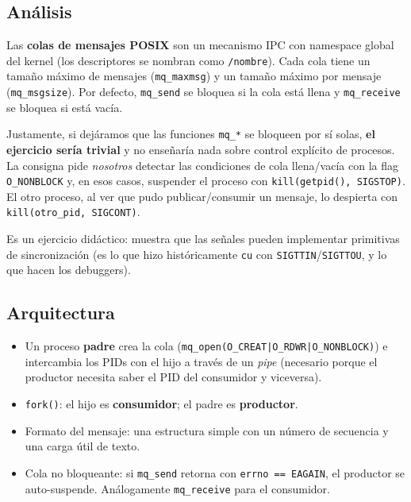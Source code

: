 \documentclass[11pt,a4paper]{article}
\begin{document}
\subsection*{Análisis}

Las \textbf{colas de mensajes POSIX} son un mecanismo IPC con
namespace global del kernel (los descriptores se nombran como
\texttt{/nombre}). Cada cola tiene un tamaño máximo de mensajes
(\texttt{mq\_maxmsg}) y un tamaño máximo por mensaje
(\texttt{mq\_msgsize}). Por defecto, \texttt{mq\_send} se bloquea si
la cola está llena y \texttt{mq\_receive} se bloquea si está vacía.

\begin{ojo}
Justamente, si dejáramos que las funciones \texttt{mq\_*} se bloqueen
por sí solas, \textbf{el ejercicio sería trivial} y no enseñaría nada
sobre control explícito de procesos. La consigna pide \emph{nosotros}
detectar las condiciones de cola llena/vacía con la flag
\texttt{O\_NONBLOCK} y, en esos casos, suspender el proceso con
\texttt{kill(getpid(), SIGSTOP)}. El otro proceso, al ver que pudo
publicar/consumir un mensaje, lo despierta con
\texttt{kill(otro\_pid, SIGCONT)}.

Es un ejercicio didáctico: muestra que las señales pueden
implementar primitivas de sincronización (es lo que hizo
históricamente \texttt{cu} con \texttt{SIGTTIN}/\texttt{SIGTTOU},
y lo que hacen los debuggers).
\end{ojo}

\subsection*{Arquitectura}

\begin{itemize}[leftmargin=*]
    \item Un proceso \textbf{padre} crea la cola
        (\texttt{mq\_open(O\_CREAT|O\_RDWR|O\_NONBLOCK)}) e
        intercambia los PIDs con el hijo a través de un \emph{pipe}
        (necesario porque el productor necesita saber el PID del
        consumidor y viceversa).
    \item \texttt{fork()}: el hijo es \textbf{consumidor}; el padre es
        \textbf{productor}.
    \item Formato del mensaje: una estructura simple con un número de
        secuencia y una carga útil de texto.
    \item Cola no bloqueante: si \texttt{mq\_send} retorna con
        \texttt{errno == EAGAIN}, el productor se auto-suspende.
        Análogamente \texttt{mq\_receive} para el consumidor.
\end{itemize}
\end{document}
